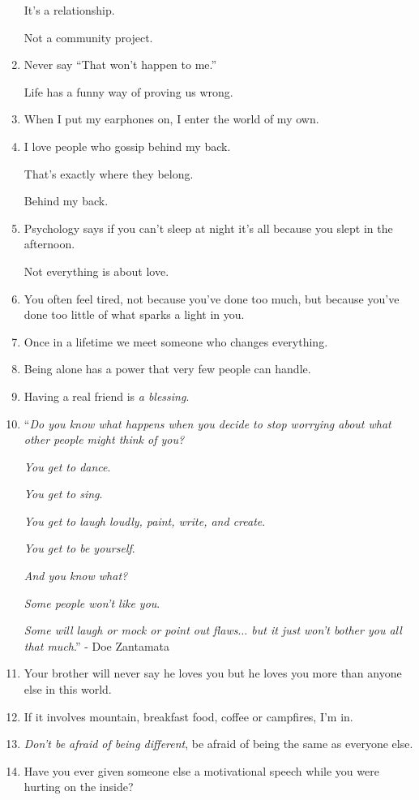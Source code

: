\documentclass{article}
\begin{document}
\begin{enumerate}
	It's a relationship.
	
	Not a community project.
	\item Never say ``That won't happen to me.''
	
	Life has a funny way of proving us wrong.
	\item When I put my earphones on, I enter the world of my own.
	\item I love people who gossip behind my back.
	
	That's exactly where they belong.
	
	Behind my back.
	\item Psychology says if you can't sleep at night it's all because you slept in the afternoon.
	
	Not everything is about love.
	\item You often feel tired, not because you've done too much, but because you've done too little of what sparks a light in you.
	\item Once in a lifetime we meet someone who changes everything.
	\item Being alone has a power that very few people can handle.
	\item Having a real friend is \textit{a blessing}.
	\item ``\textit{Do you know what happens when you decide to stop worrying about what other people might think of you?}
	
	\textit{You get to dance}.
	
	\textit{You get to sing}.
	
	\textit{You get to laugh loudly, paint, write, and create}.
	
	\textit{You get to be yourself}.
	
	\textit{And you know what?}
	
	\textit{Some people won't like you}.
	
	\textit{Some will laugh or mock or point out flaws$\ldots$ but it just won't bother you all that much}.'' - Doe Zantamata
	\item Your brother will never say he loves you but he loves you more than anyone else in this world.
	\item If it involves mountain, breakfast food, coffee or campfires, I'm in.
	\item \textit{Don't be afraid of being different}, be afraid of being the same as everyone else.
	\item Have you ever given someone else a motivational speech while you were hurting on the inside?
	

\end{enumerate}
\end{document}
